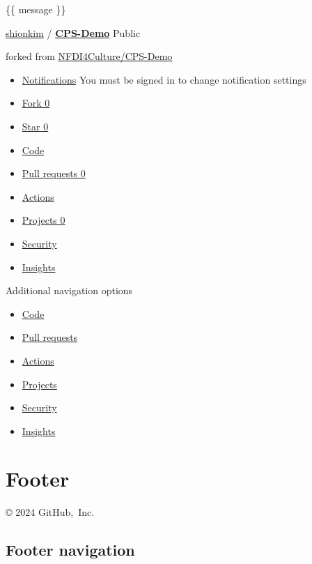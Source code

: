 \documentclass[
  letterpaper,
]{book}
\providecommand{\tightlist}{%
  \setlength{\itemsep}{0pt}\setlength{\parskip}{0pt}}\usepackage{longtable,booktabs,array}
\begin{document}
\{\{ message \}\}

\href{./shionkim}{shionkim} /
\textbf{\href{./shionkim/CPS-Demo}{CPS-Demo}} Public

forked from \href{./NFDI4Culture/CPS-Demo}{NFDI4Culture/CPS-Demo}

\begin{itemize}
\item
  \href{./login?return_to=\%2Fshionkim\%2FCPS-Demo}{Notifications} You
  must be signed in to change notification settings
\item
  \href{./login?return_to=\%2Fshionkim\%2FCPS-Demo}{Fork 0}
\item
  \href{./login?return_to=\%2Fshionkim\%2FCPS-Demo}{Star 0}
\item
  \href{./shionkim/CPS-Demo}{Code}
\item
  \href{./shionkim/CPS-Demo/pulls}{Pull requests 0}
\item
  \href{./shionkim/CPS-Demo/actions}{Actions}
\item
  \href{./shionkim/CPS-Demo/projects}{Projects 0}
\item
  \href{./shionkim/CPS-Demo/security}{Security}
\item
  \href{./shionkim/CPS-Demo/pulse}{Insights}
\end{itemize}

Additional navigation options

\begin{itemize}
\tightlist
\item
  \href{./shionkim/CPS-Demo}{Code}
\item
  \href{./shionkim/CPS-Demo/pulls}{Pull requests}
\item
  \href{./shionkim/CPS-Demo/actions}{Actions}
\item
  \href{./shionkim/CPS-Demo/projects}{Projects}
\item
  \href{./shionkim/CPS-Demo/security}{Security}
\item
  \href{./shionkim/CPS-Demo/pulse}{Insights}
\end{itemize}

\section{Footer}\label{footer}

© 2024 GitHub,~Inc.

\subsection{Footer navigation}\label{footer-navigation}
\end{document}
